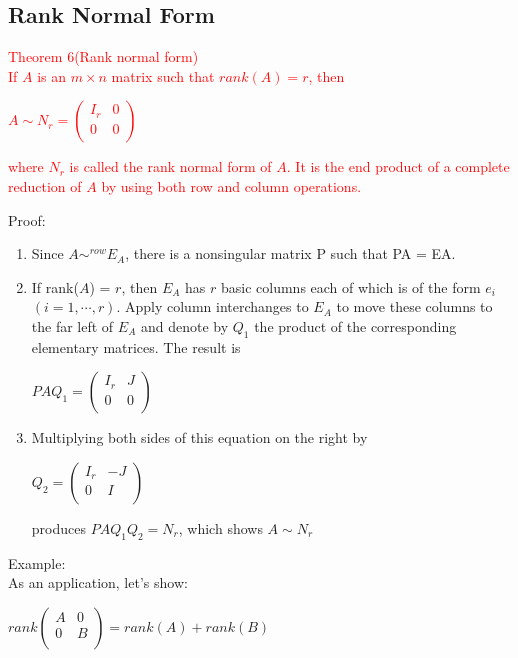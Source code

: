 \documentclass[UTF8,a4paper, 10pt, openany]{svmono}
\begin{document}
\subsection{Rank Normal Form}
\textcolor{red}{Theorem 6(Rank normal form)\\
If $A$ is an $m\times n$ matrix such that $rank(A) = r$, then
\begin{center}
$A \sim N_r = 
\begin{pmatrix}
I_r & 0 \\
0 & 0 \\
\end{pmatrix}$
\end{center}
where $N_r$ is called the rank normal form of $A$. It is the end product of a complete reduction of $A$ by using both row and column operations.}
Proof:\\
\begin{enumerate}
\item Since $A \sim ^{row} E_A$, there is a nonsingular matrix P such that PA = EA.
\item If rank($A$) = $r$, then $E_A$ has $r$ basic columns each of which is of the form $e_i$ $(i = 1, \cdots , r)$. Apply column interchanges to $E_A$ to move these columns to the far left of $E_A$ and denote by $Q_1$ the product of the corresponding elementary matrices. The result is
\begin{center}
$PAQ_1=
\begin{pmatrix}
I_r & J \\
0 & 0 \\
\end{pmatrix}$
\end{center}
\item Multiplying both sides of this equation on the right by
\begin{center}
$Q_2=
\begin{pmatrix}
I_r & -J \\
0 & I \\
\end{pmatrix}$
\end{center}
produces $PAQ_1Q_2=N_r$, which shows $A\sim N_r$
\end{enumerate}
Example:\\
As an application, let's show:
\begin{center}
$rank
\begin{pmatrix}
A & 0 \\
0 & B \\
\end{pmatrix}
= rank(A)+rank(B)$
\end{center}
\end{document}
